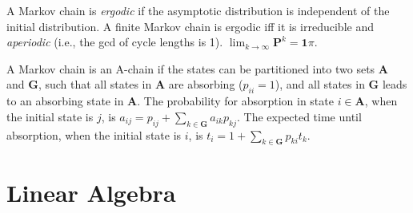 A Markov chain is \emph{ergodic} if the asymptotic distribution is independent of the initial distribution.
A finite Markov chain is ergodic iff it is irreducible and \emph{aperiodic} (i.e., the gcd of cycle lengths is 1).
$\lim_{k\rightarrow\infty}\mathbf{P}^k = \mathbf{1}\pi$.

A Markov chain is an A-chain if the states can be partitioned into two sets $\mathbf{A}$ and $\mathbf{G}$, such that all states in $\mathbf{A}$ are absorbing ($p_{ii}=1$), and all states in $\mathbf{G}$ leads to an absorbing state in $\mathbf{A}$.
The probability for absorption in state $i\in\mathbf{A}$, when the initial state is $j$, is $a_{ij} = p_{ij}+\sum_{k\in\mathbf{G}} a_{ik}p_{kj}$.
The expected time until absorption, when the initial state is $i$, is $t_i = 1+\sum_{k\in\mathbf{G}}p_{ki}t_k$.

\section{Linear Algebra}
